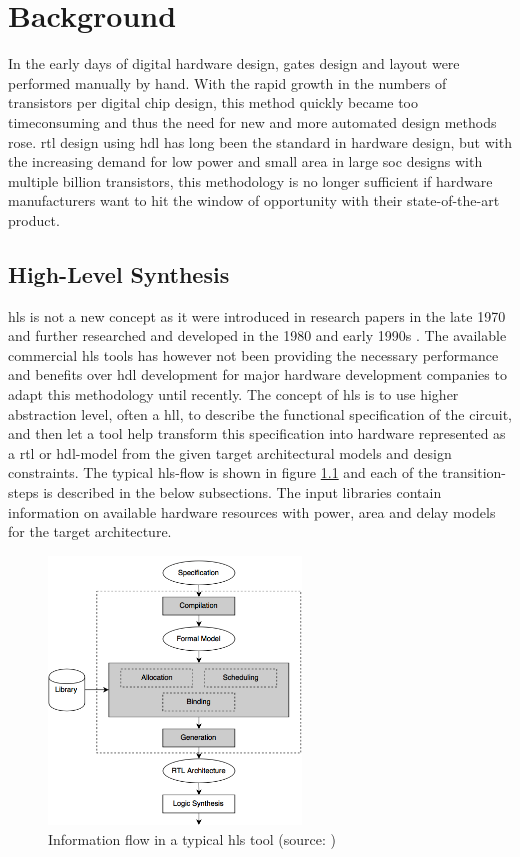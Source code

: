 \chapter{\label{chp:background}Background}
In the early days of digital hardware design, gates design and layout were performed manually by hand. With the rapid growth in the numbers of transistors per digital chip design, this method quickly became too timeconsuming and thus the need for new and more automated design methods rose. \gls{rtl} design using \gls{hdl} has long been the standard in hardware design, but with the increasing demand for low power and small area in large \gls{soc} designs with multiple billion transistors, this methodology is no longer sufficient if hardware manufacturers want to hit the window of opportunity with their state-of-the-art product.

\section{\label{sec:hls}High-Level Synthesis}

\gls{hls} is not a new concept as it were introduced in research papers in the late 1970 and further researched and developed in the 1980 and early 1990s \cite{martin2009high}. The available commercial \gls{hls} tools has however not been providing the necessary performance and benefits over \gls{hdl} development for major hardware development companies to adapt this methodology until recently.
The concept of \gls{hls} is to use higher abstraction level, often a \gls{hll}, to describe the functional specification of the circuit, and then let a tool help transform this specification into hardware represented as a \gls{rtl} or \gls{hdl}-model from the given target architectural models and design constraints. The typical \gls{hls}-flow is shown in figure \ref{fig:hlsflow} and each of the transition-steps is described in the below subsections. The input libraries contain information on available hardware resources with power, area and delay models for the target architecture.

\begin{figure}[hbpt]
\centering
\includegraphics[width=0.6\textwidth]{../figs/HLSFlow.png}
\caption{\label{fig:hlsflow}Information flow in a typical \gls{hls} tool (source: \cite{coussy2009introduction})}
\end{figure}

